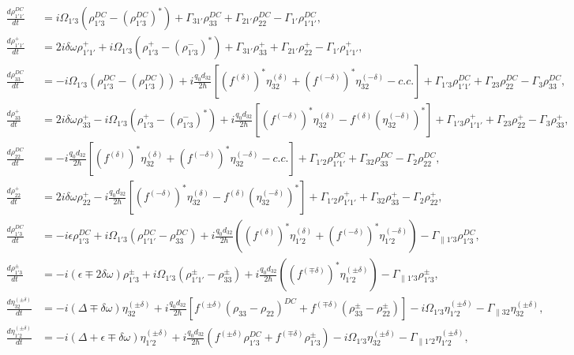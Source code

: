 \documentclass[]{spie}  %
\begin{document}
\begin{subequations}
	\label{eq:mainsystem}
	\begin{align}
	\label{eq:temporal-hole-11}
	\frac{d\rho_{1'1'}^{DC}}{dt} &= i\Omega_{1'3}(\rho_{1'3}^{DC}-(\rho_{1'3}^{DC})^*) +  \Gamma_{31'}\rho_{33}^{DC} + \Gamma_{21'}\rho_{22}^{DC}  -\Gamma_{1'}\rho_{1'1'}^{DC}, \\
	\frac{d\rho_{1'1'}^{+}}{dt} &= 2i\delta\omega\rho_{1'1'}^{+} + i\Omega_{1'3}(\rho_{1'3}^{+}-(\rho_{1'3}^{-})^*) +  \Gamma_{31'}\rho_{33}^{+} + \Gamma_{21'}\rho_{22}^{+}  -\Gamma_{1'}\rho_{1'1'}^{+}, \\
	\label{eq:temporal-hole-33}
	\frac{d\rho_{33}^{DC}}{dt} &= -i\Omega_{1'3}(\rho_{1'3}^{DC}-(\rho_{1'3}^{DC})) + i\frac{q_0d_{32}}{2\hbar} \left [ ( f^{(\delta)})^*\eta_{32}^{(\delta)} +(f^{(-\delta)})^*\eta_{32}^{(-\delta)} -c.c.\right]
	+\Gamma_{1'3}\rho_{1'1'}^{DC} + \Gamma_{23}\rho_{22}^{DC} - \Gamma_3 \rho_{33}^{DC}, \\
	\frac{d\rho_{33}^{+}}{dt} &= 2i\delta\omega\rho_{33}^{+} - i\Omega_{1'3}(\rho_{1'3}^{+}-(\rho_{1'3}^{-})^*) + i\frac{q_0d_{32}}{2\hbar} \left [ (f^{(-\delta)})^*\eta_{32}^{(\delta)} -f^{(\delta)}(\eta_{32}^{(-\delta)})^*\right]
	+\Gamma_{1'3}\rho_{1'1'}^{+} + \Gamma_{23}\rho_{22}^{+} - \Gamma_3 \rho_{33}^{+}, \\
	\frac{d\rho_{22}^{DC}}{dt} &= -i\frac{q_0d_{32}}{2\hbar} \left [ ( f^{(\delta)})^*\eta_{32}^{(\delta)} +(f^{(-\delta)})^*\eta_{32}^{(-\delta)} -c.c.\right]
	+\Gamma_{1'2}\rho_{1'1'}^{DC} + \Gamma_{32}\rho_{33}^{DC} - \Gamma_2 \rho_{22}^{DC}, \\
	\frac{d\rho_{22}^{+}}{dt} &= 2i\delta\omega\rho_{22}^{+} - i\frac{q_0d_{32}}{2\hbar} \left [ (f^{(-\delta)})^*\eta_{32}^{(\delta)} -f^{(\delta)}(\eta_{32}^{(-\delta)})^*\right]
	+\Gamma_{1'2}\rho_{1'1'}^{+} + \Gamma_{32}\rho_{33}^{+} - \Gamma_2 \rho_{22}^{+}, \\
	\frac{d \rho_{1'3}^{DC}}{d t}  &= -i\epsilon\rho_{1'3}^{DC} +i \Omega_{1'3}(\rho_{1'1'}^{DC} - \rho_{33}^{DC}) +i\frac{q_0d_{32}}{2 \hbar}((f^{(\delta)})^*\eta_{1'2}^{(\delta)} +(f^{(-\delta)})^*\eta_{1'2}^{(-\delta)})
	-\Gamma_{\parallel 1'3} \rho_{1'3}^{DC},  \\
	\frac{d \rho_{1'3}^{\pm}}{d t}  &= -i(\epsilon \mp 2\delta\omega)\rho_{1'3}^{\pm} +i \Omega_{1'3}(\rho_{1'1'}^{\pm} - \rho_{33}^{\pm}) +i\frac{q_0d_{32}}{2 \hbar}( (f^{(\mp\delta)})^*\eta_{1'2}^{(\pm\delta)} )- \Gamma_{\parallel 1'3} \rho_{1'3}^{\pm},\\
	\frac{d \eta_{32}^{(\pm\delta)}}{d t} &= -i(\Delta \mp \delta\omega)\eta_{32}^{(\pm\delta)}
	+i\frac{q_0d_{32}}{2\hbar} \left[ f^{(\pm\delta)}(\rho_{33}-\rho_{22})^{DC} + f^{(\mp \delta)} (\rho_{33}^{\pm}-\rho_{22}^{\pm})\right]-i\Omega_{1'3}\eta_{1'2}^{(\pm\delta)}- \Gamma_{\parallel 32}\eta_{32}^{(\pm\delta)}, \label{eq:eta_1'3-temphole} \\
	\frac{d \eta_{1'2}^{(\pm\delta)}}{d t} &= -i(\Delta+\epsilon \mp \delta\omega)\eta_{1'2}^{(\pm\delta)}+i\frac{q_0d_{32}}{2\hbar} ( f^{(\pm\delta)}\rho_{1'3}^{DC} + f^{(\mp \delta)} \rho_{1'3}^{\pm})-i\Omega_{1'3}\eta_{32}^{(\pm\delta)}-
	\Gamma_{\parallel 1'2}\eta_{1'2}^{(\pm\delta)}, \label{eq:eta_1'2-temphole}
	\end{align} 
\end{subequations}
\end{document}
